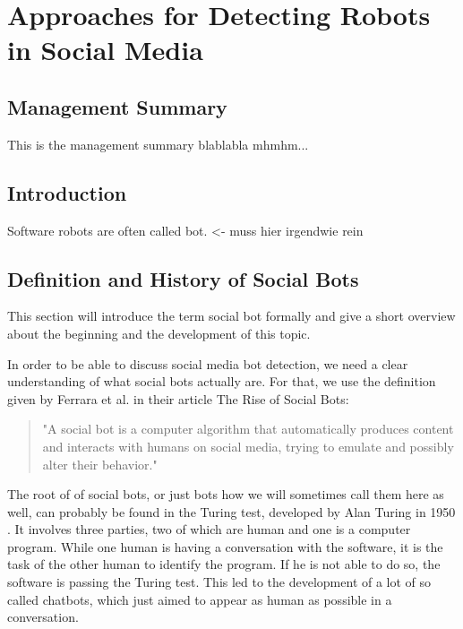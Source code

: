\newpage
\chapter{Approaches for Detecting Robots \\ in Social Media}


\section*{Management Summary}
This is the management summary blablabla mhmhm...

\section{Introduction}
Software robots are often called bot. <- muss hier irgendwie rein 

\section{Definition and History of Social Bots} 
This section will introduce the term social bot formally and give a short overview about the beginning and the development of this topic.

In order to be able to discuss social media bot detection, we need a clear understanding of what social bots actually are.  For that, we use the definition given by Ferrara et al. in their article The Rise of Social Bots:
\begin{quote}
	"A social bot is a computer algorithm that automatically produces content and interacts with humans on social media, trying to emulate and possibly alter their behavior." \cite{ferrara15}
\end{quote}

The root of of social bots, or just bots how we will sometimes call them here as well, can probably be found in the Turing test, developed by Alan Turing in 1950 \cite{turing}. It involves three parties, two of which are human and one is a computer program. While one human is having a conversation with the software, it is the task of the other human to identify the program. If he is not able to do so, the software is passing the Turing test. This led to the development of a lot of so called chatbots, which just aimed to appear as human as possible in a conversation.  

